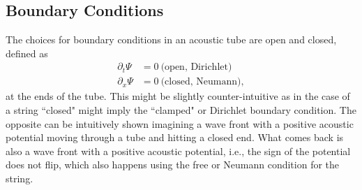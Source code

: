 \subsection{Boundary Conditions}
The choices for boundary conditions in an acoustic tube are open and closed, defined as \cite{Bilbao2018}
\begin{equation}
    \begin{split}
        \partial_t\Psi &= 0\ \text{(open, Dirichlet)}\\
        \partial_x\Psi &= 0\ \text{(closed, Neumann)},
    \end{split}
\end{equation} 
at the ends of the tube. This might be slightly counter-intuitive as in the case of a string ``closed" might imply the ``clamped" or Dirichlet boundary condition. The opposite can be intuitively shown imagining a wave front with a positive acoustic potential moving through a tube and hitting a closed end. What comes back is also a wave front with a positive acoustic potential, i.e., the sign of the potential does not flip, which also happens using the free or Neumann condition for the string.

